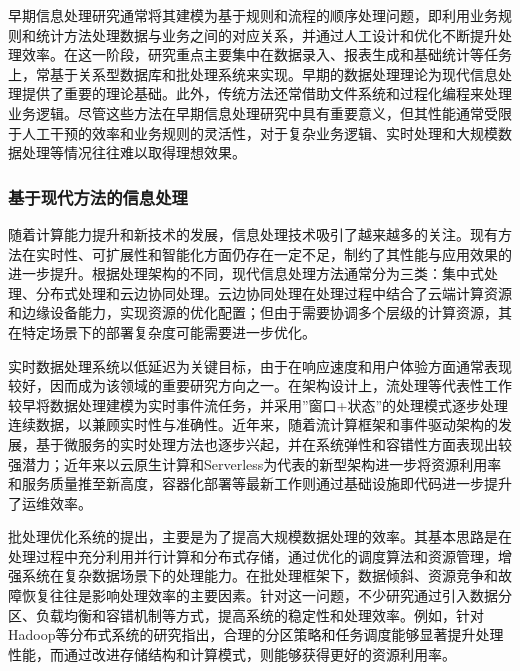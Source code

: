 早期信息处理研究通常将其建模为基于规则和流程的顺序处理问题，即利用业务规则和统计方法处理数据与业务之间的对应关系，并通过人工设计和优化不断提升处理效率。在这一阶段，研究重点主要集中在数据录入、报表生成和基础统计等任务上，常基于关系型数据库和批处理系统来实现。早期的数据处理理论为现代信息处理提供了重要的理论基础。此外，传统方法还常借助文件系统和过程化编程来处理业务逻辑。尽管这些方法在早期信息处理研究中具有重要意义，但其性能通常受限于人工干预的效率和业务规则的灵活性，对于复杂业务逻辑、实时处理和大规模数据处理等情况往往难以取得理想效果。

\subsubsection{基于现代方法的信息处理}\label{subsec:intro-info-processing-modern}

随着计算能力提升和新技术的发展，信息处理技术吸引了越来越多的关注。现有方法在实时性、可扩展性和智能化方面仍存在一定不足，制约了其性能与应用效果的进一步提升。根据处理架构的不同，现代信息处理方法通常分为三类：集中式处理、分布式处理和云边协同处理。云边协同处理在处理过程中结合了云端计算资源和边缘设备能力，实现资源的优化配置；但由于需要协调多个层级的计算资源，其在特定场景下的部署复杂度可能需要进一步优化。


实时数据处理系统以低延迟为关键目标，由于在响应速度和用户体验方面通常表现较好，因而成为该领域的重要研究方向之一。在架构设计上，流处理等代表性工作较早将数据处理建模为实时事件流任务，并采用”窗口+状态”的处理模式逐步处理连续数据，以兼顾实时性与准确性。近年来，随着流计算框架和事件驱动架构的发展，基于微服务的实时处理方法也逐步兴起，并在系统弹性和容错性方面表现出较强潜力；近年来以云原生计算和Serverless为代表的新型架构进一步将资源利用率和服务质量推至新高度，容器化部署等最新工作则通过基础设施即代码进一步提升了运维效率。


批处理优化系统的提出，主要是为了提高大规模数据处理的效率。其基本思路是在处理过程中充分利用并行计算和分布式存储，通过优化的调度算法和资源管理，增强系统在复杂数据场景下的处理能力。在批处理框架下，数据倾斜、资源竞争和故障恢复往往是影响处理效率的主要因素。针对这一问题，不少研究通过引入数据分区、负载均衡和容错机制等方式，提高系统的稳定性和处理效率。例如，针对Hadoop等分布式系统的研究指出，合理的分区策略和任务调度能够显著提升处理性能，而通过改进存储结构和计算模式，则能够获得更好的资源利用率。

